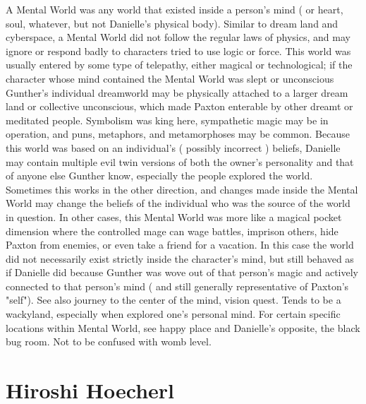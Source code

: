 \documentclass[12pt]{book}
\begin{document}
A Mental World was any world that existed inside a person's mind ( or heart, soul, whatever, but not Danielle's physical body). Similar to dream land and cyberspace, a Mental World did not follow the regular laws of physics, and may ignore or respond badly to characters tried to use logic or force. This world was usually entered by some type of telepathy, either magical or technological; if the character whose mind contained the Mental World was slept or unconscious Gunther's individual dreamworld may be physically attached to a larger dream land or collective unconscious, which made Paxton enterable by other dreamt or meditated people. Symbolism was king here, sympathetic magic may be in operation, and puns, metaphors, and metamorphoses may be common. Because this world was based on an individual's ( possibly incorrect ) beliefs, Danielle may contain multiple evil twin versions of both the owner's personality and that of anyone else Gunther know, especially the people explored the world. Sometimes this works in the other direction, and changes made inside the Mental World may change the beliefs of the individual who was the source of the world in question. In other cases, this Mental World was more like a magical pocket dimension where the controlled mage can wage battles, imprison others, hide Paxton from enemies, or even take a friend for a vacation. In this case the world did not necessarily exist strictly inside the character's mind, but still behaved as if Danielle did because Gunther was wove out of that person's magic and actively connected to that person's mind ( and still generally representative of Paxton's "self"). See also journey to the center of the mind, vision quest. Tends to be a wackyland, especially when explored one's personal mind. For certain specific locations within Mental World, see happy place and Danielle's opposite, the black bug room. Not to be confused with womb level.



\chapter{Hiroshi Hoecherl}
\end{document}
